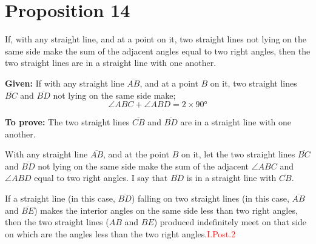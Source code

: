 
\section*{Proposition 14}

\begin{thm}
If, with any straight line, and at a point on it, two straight lines not lying on the same side make the sum of the adjacent angles equal to two right angles, then the two straight lines are in a straight line with one another.
\end{thm}

\textbf{Given:} If with any straight line $\overline{AB}$, and at a point $B$ on it, two straight lines $\overline{BC}$ and $\overline{BD}$ not lying on the same side make;  \[\angle{ABC} + \angle{ABD} =2\times\ang{90}\]

\textbf{To prove:} The two straight lines $\overline{CB}$ and $\overline{BD}$ are in a straight line with one another.


With any straight line $\overline{AB}$, and at the point $B$ on it, let the two straight lines $\overline{BC}$ and $\overline{BD}$ not lying on the same side make the sum of the adjacent $\angle{ABC}$ and $\angle{ABD}$ equal to two right angles. I say that $\overline{BD}$ is in a straight line with $\overline{CB}$.

\begin{figure}[H]
	\begin{subfigure}{0.35\textwidth}
		\caption{}
	\end{subfigure}
	\begin{subfigure}{0.35\textwidth}
		\caption{}
	\end{subfigure}
	\caption{}
\end{figure}

\begin{lemma}
If a straight line (in this case, $\overline{BD}$) falling on two straight lines (in this case, $\overline{AB}$ and $\overline{BE}$) makes the interior angles on the same side less than two right angles, then the two straight lines ($AB$ and $BE$) produced indefinitely meet on that side on which are the angles less than the two right angles.\hfill\textcolor{red}{I.Post.2}
\end{lemma}

